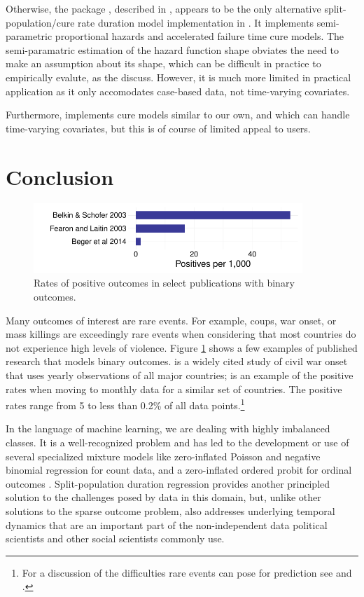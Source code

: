 \documentclass[article]{jss}
\begin{document}
Otherwise, the  package \citep{cai2012smcureR}, described in \citet{cai2012smcure}, appears to be the only alternative split-population/cure rate duration model implementation in . It implements semi-parametric proportional hazards and accelerated failure time cure models. The semi-paramatric estimation of the hazard function shape obviates the need to make an assumption about its shape, which can be difficult in practice to empirically evalute, as the  discuss. However, it is much more limited in practical application as it only accomodates case-based data, not time-varying covariates. 

Furthermore,  implements cure models similar to our own, and which can handle time-varying covariates, but this is of course of limited appeal to  users. 

\section{Conclusion}

\begin{figure}[htbp!]
\centering
\includegraphics[width = 4in]{graphics/rates.pdf}
\caption{Rates of positive outcomes in select publications with binary outcomes.}
\label{rates}
\end{figure}

Many outcomes of interest are rare events. For example, coups, war
onset, or mass killings are exceedingly rare events when considering
that most countries do not experience high levels of violence. Figure
\ref{rates} shows a few examples of published research that models
binary outcomes. \citet{fearon2003ethnicity} is a widely cited study of
civil war onset that uses yearly observations of all major countries;
\citet{beger2014ensemble} is an example of the positive rates when
moving to monthly data for a similar set of countries. The positive
rates range from 5 to less than 0.2\% of all data points.\footnote{For a
  discussion of the difficulties rare events can pose for prediction see
  \citet{king2001explaining} and \citet{king2001logistic}.}

In the language of machine learning, we are dealing with highly
imbalanced classes. It is a well-recognized problem and has led to the
development or use of several specialized mixture models like
zero-inflated Poisson and negative binomial regression for count data,
and a zero-inflated ordered probit for ordinal outcomes \citep{bagozzi2015modeling}. Split-population duration regression provides another principled
solution to the challenges posed by data in this domain, but, unlike
other solutions to the sparse outcome problem, also addresses underlying
temporal dynamics that are an important part of the non-independent data
political scientists and other social scientists commonly use.
\end{document}
